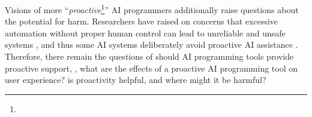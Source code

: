 Visions of more ``\textit{proactive}\footnote{}'' AI programmers additionally raise questions about the potential for harm. 
Researchers have raised on concerns that excessive automation without proper human control can lead to unreliable and unsafe systems \cite{Shneiderman_2020_hcai}, and thus some AI systems deliberately avoid proactive AI assistance \cite{ross2023programmerassistant}.
Therefore, there remain the questions of  should AI programming tools provide proactive support,  , what are the effects of a proactive AI programming tool on user experience?  is proactivity helpful, and where might it be harmful? 

